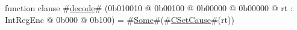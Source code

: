 function clause #\hyperref[sailMIPSzdecode]{decode}# (0b010010 @ 0b00100 @ 0b00000 @ 0b00000 @ rt : IntRegEnc @ 0b000 @ 0b100) = #\hyperref[sailMIPSzSome]{Some}#(#\hyperref[sailMIPSzCSetCause]{CSetCause}#(rt))
